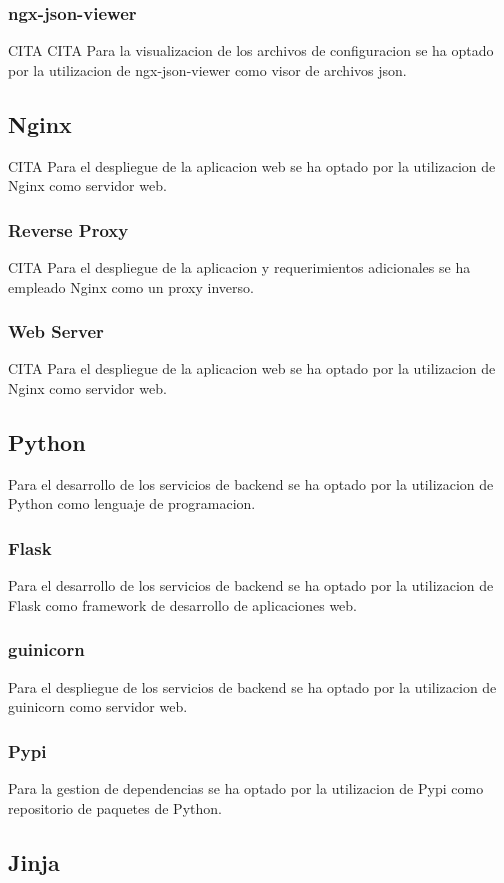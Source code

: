 \documentclass[12pt, a4paper, twoside]{article}
\begin{document}
\subsubsection{ngx-json-viewer}
CITA
CITA Para la visualizacion de los archivos de configuracion se ha optado por la utilizacion de ngx-json-viewer como visor de archivos json.

\subsection{Nginx}
CITA
Para el despliegue de la aplicacion web se ha optado por la utilizacion de Nginx como servidor web.
\subsubsection{Reverse Proxy}
CITA
Para el despliegue de la aplicacion y requerimientos adicionales se ha empleado Nginx como un proxy inverso.
\subsubsection{Web Server}
CITA
Para el despliegue de la aplicacion web se ha optado por la utilizacion de Nginx como servidor web.

\subsection{Python}
Para el desarrollo de los servicios de backend se ha optado por la utilizacion de Python como lenguaje de programacion.
\subsubsection{Flask}
Para el desarrollo de los servicios de backend se ha optado por la utilizacion de Flask como framework de desarrollo de aplicaciones web.
\subsubsection{guinicorn}
Para el despliegue de los servicios de backend se ha optado por la utilizacion de guinicorn como servidor web.
\subsubsection{Pypi}
Para la gestion de dependencias se ha optado por la utilizacion de Pypi como repositorio de paquetes de Python.

\subsection{Jinja}
\end{document}
